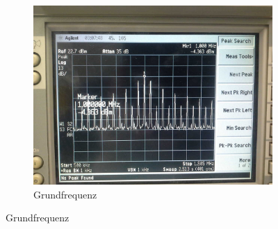 \FloatBarrier
\begin{figure}
	\begin{subfigure}[t]{1\textwidth}
		\centering
		\includegraphics[scale=0.17]{../Grafiken/Frequenzspektrum_d_FreqModuliert_0.jpg}
		\caption{Grundfrequenz\label{fig:frequenzspektrum_d_freqmoduliert_0}}
	\end{subfigure}%
	

\end{figure}
